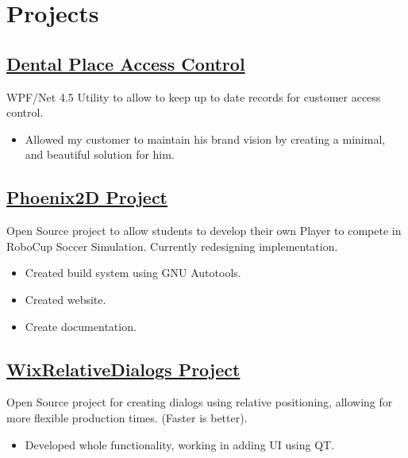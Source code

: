 \documentclass{scrartcl}
\begin{document}
\section*{Projects}
\subsection*{\href{https://bitbucket.org/claudiordgz/dentalplacecustomeraccess/src}{Dental Place Access Control}}

WPF/Net 4.5 Utility to allow to keep up to date records for customer access control.
 
\begin{itemize}[leftmargin=*]
	\setlength{\itemsep}{1pt}
  \setlength{\parskip}{0pt}
  \setlength{\parsep}{0pt}
	\item Allowed my customer to maintain his brand vision by creating a minimal, and beautiful solution for him.
\end{itemize}


\subsection*{\href{http://claudiordgz.github.io/Phoenix2D/}{Phoenix2D Project}}

Open Source project to allow students to develop their own Player to compete in RoboCup Soccer Simulation. Currently redesigning implementation.
\begin{itemize}[leftmargin=*]
	\setlength{\itemsep}{1pt}
  \setlength{\parskip}{0pt}
  \setlength{\parsep}{0pt}
	\item Created build system using GNU Autotools.
	\item Created website.
	\item Create documentation.
\end{itemize}

\subsection*{\href{https://github.com/claudiordgz/WixRelativeDialogs/}{WixRelativeDialogs Project}}

Open Source project for creating dialogs using relative positioning, allowing for more flexible production times. (Faster is better).

\begin{itemize}[leftmargin=*]
	\setlength{\itemsep}{1pt}
  \setlength{\parskip}{0pt}
  \setlength{\parsep}{0pt}
	\item Developed whole functionality, working in adding UI using QT. 
\end{itemize}
	
\end{document}
